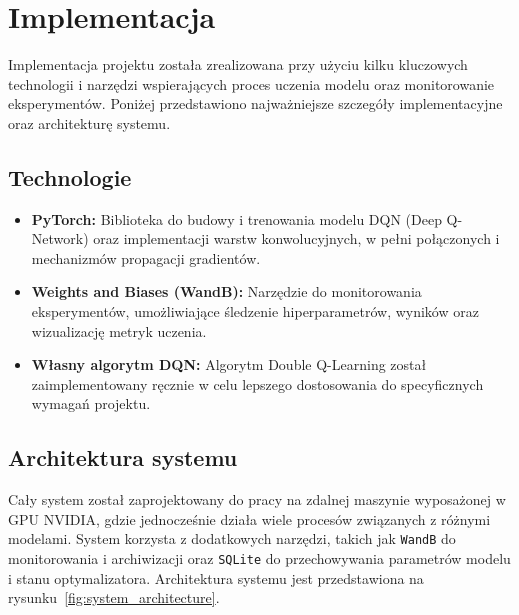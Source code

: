 \chapter{Implementacja}

Implementacja projektu została zrealizowana przy użyciu kilku kluczowych technologii i narzędzi wspierających proces uczenia modelu oraz monitorowanie eksperymentów. Poniżej przedstawiono najważniejsze szczegóły implementacyjne oraz architekturę systemu.

\section{Technologie}

\begin{itemize}
	\item \textbf{PyTorch:} Biblioteka do budowy i trenowania modelu DQN (Deep Q-Network) oraz implementacji warstw konwolucyjnych, w pełni połączonych i mechanizmów propagacji gradientów.
	\item \textbf{Weights and Biases (WandB):} Narzędzie do monitorowania eksperymentów, umożliwiające śledzenie hiperparametrów, wyników oraz wizualizację metryk uczenia.
	\item \textbf{Własny algorytm DQN:} Algorytm Double Q-Learning został zaimplementowany ręcznie w celu lepszego dostosowania do specyficznych wymagań projektu.
\end{itemize}
\section{Architektura systemu}

Cały system został zaprojektowany do pracy na zdalnej maszynie wyposażonej w GPU NVIDIA, gdzie jednocześnie działa wiele procesów związanych z różnymi modelami. System korzysta z dodatkowych narzędzi, takich jak \texttt{WandB} do monitorowania i archiwizacji oraz \texttt{SQLite} do przechowywania parametrów modelu i stanu optymalizatora. Architektura systemu jest przedstawiona na rysunku~\ref{fig:system_architecture}.

